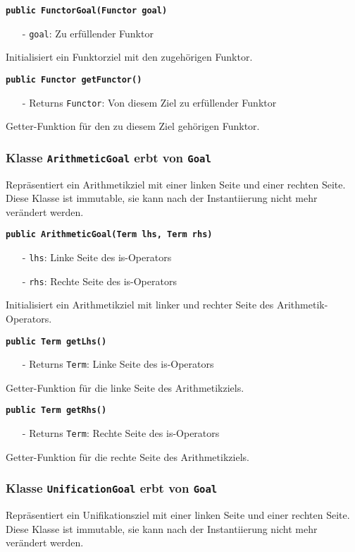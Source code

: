 \documentclass[parskip=full,11pt,twoside]{scrartcl}
\begin{document}
\textbf{\texttt{public FunctorGoal(Functor goal)}}
\begin{itemize}[noitemsep]
	\item[-] \texttt{goal}: Zu erfüllender Funktor
\end{itemize}
Initialisiert ein Funktorziel mit den zugehörigen Funktor.

\textbf{\texttt{public Functor getFunctor()}}
\begin{itemize}[noitemsep]
	\item[-] Returns \texttt{Functor}: Von diesem Ziel zu erfüllender Funktor
\end{itemize}
Getter-Funktion für den zu diesem Ziel gehörigen Funktor.

\subsubsection{Klasse \texttt{ArithmeticGoal} erbt von \texttt{Goal}}
Repräsentiert ein Arithmetikziel mit einer linken Seite und einer rechten Seite. Diese Klasse ist immutable, sie kann nach der Instantiierung nicht mehr verändert werden.

\textbf{\texttt{public ArithmeticGoal(Term lhs, Term rhs)}}
\begin{itemize}[noitemsep]
	\item[-] \texttt{lhs}: Linke Seite des is-Operators
	\item[-] \texttt{rhs}: Rechte Seite des is-Operators
\end{itemize}
Initialisiert ein Arithmetikziel mit linker und rechter Seite des Arithmetik-Operators.

\textbf{\texttt{public Term getLhs()}}
\begin{itemize}[noitemsep]
	\item[-] Returns \texttt{Term}: Linke Seite des is-Operators
\end{itemize}
Getter-Funktion für die linke Seite des Arithmetikziels.

\textbf{\texttt{public Term getRhs()}}
\begin{itemize}[noitemsep]
	\item[-] Returns \texttt{Term}: Rechte Seite des is-Operators
\end{itemize}
Getter-Funktion für die rechte Seite des Arithmetikziels.

\subsubsection{Klasse \texttt{UnificationGoal} erbt von \texttt{Goal}}
Repräsentiert ein Unifikationsziel mit einer linken Seite und einer rechten Seite. Diese Klasse ist immutable, sie kann nach der Instantiierung nicht mehr verändert werden.
\end{document}
